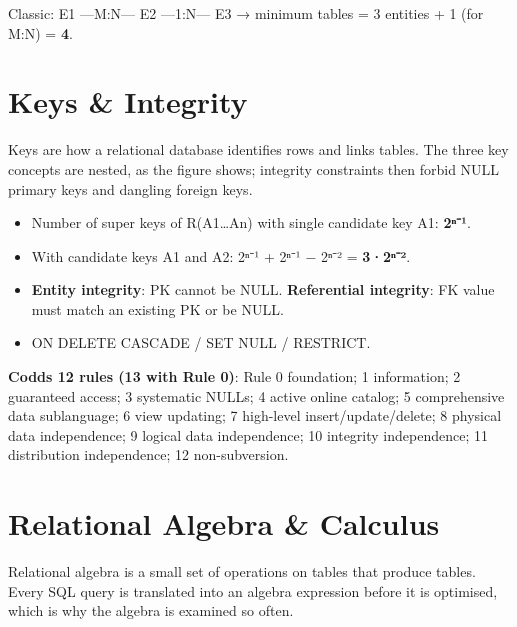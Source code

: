 \endgroup

Classic: E1 ---M:N--- E2 ---1:N--- E3 → minimum tables = 3 entities + 1 (for M:N) = \textbf{4}.

\needspace{125pt}

\hypertarget{p2-04--3-keys--integrity}{%
\section{Keys \& Integrity}\label{p2-04--3-keys--integrity}}

Keys are how a relational database identifies rows and links tables. The three key concepts are nested, as
the figure shows; integrity constraints then forbid NULL primary keys and dangling foreign keys.



\begin{itemize}
\tightlist
\item
  Number of super keys of R(A1\ldots An) with single candidate key A1: \textbf{2ⁿ⁻¹}.
\item
  With candidate keys A1 and A2: 2ⁿ⁻¹ + 2ⁿ⁻¹ − 2ⁿ⁻² = \textbf{3·2ⁿ⁻²}.
\item
  \textbf{Entity integrity}: PK cannot be NULL. \textbf{Referential integrity}: FK value must match an existing PK or be NULL.
\item
  ON DELETE CASCADE / SET NULL / RESTRICT.
\end{itemize}

\textbf{Codd\textquotesingle s 12 rules (13 with Rule 0)}: Rule 0 foundation; 1 information; 2 guaranteed access; 3 systematic NULLs; 4 active online catalog; 5 comprehensive data sublanguage; 6 view updating; 7 high-level insert/update/delete; 8 physical data independence; 9 logical data independence; 10 integrity independence; 11 distribution independence; 12 non-subversion.

\needspace{160pt}

\hypertarget{p2-04--4-relational-algebra--calculus}{%
\section{Relational Algebra \& Calculus}\label{p2-04--4-relational-algebra--calculus}}

Relational algebra is a small set of operations on tables that produce tables. Every SQL query is
translated into an algebra expression before it is optimised, which is why the algebra is examined so
often.

